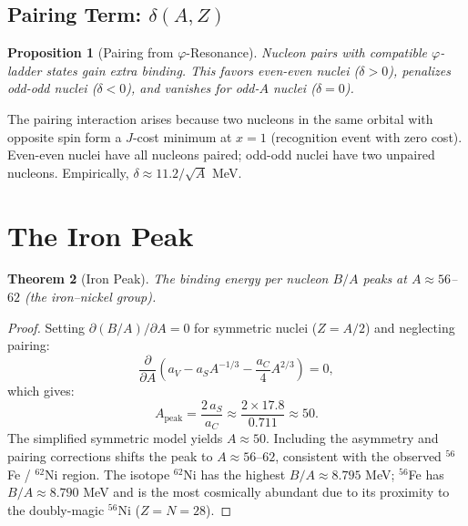 \documentclass[12pt,a4paper]{article}
\newtheorem{theorem}{Theorem}[section]
\newtheorem{proposition}[theorem]{Proposition}
\theoremstyle{definition}
\theoremstyle{remark}
\begin{document}
\subsection{Pairing Term: $\delta(A,Z)$}

\begin{proposition}[Pairing from $\varphi$-Resonance]
\label{prop:pairing}
Nucleon pairs with compatible $\varphi$-ladder states gain
extra binding.  This favors even-even nuclei
($\delta > 0$), penalizes odd-odd nuclei ($\delta < 0$),
and vanishes for odd-$A$ nuclei ($\delta = 0$).
\end{proposition}

The pairing interaction arises because two nucleons in the
same orbital with opposite spin form a $J$-cost minimum at
$x = 1$ (recognition event with zero cost).  Even-even nuclei
have all nucleons paired; odd-odd nuclei have two unpaired
nucleons.  Empirically,
$\delta \approx 11.2 / \sqrt{A}$ MeV.

\section{The Iron Peak}
\label{sec:iron}

\begin{theorem}[Iron Peak]
\label{thm:iron}
The binding energy per nucleon $B/A$ peaks at
$A \approx 56$--$62$ (the iron--nickel group).
\end{theorem}

\begin{proof}
Setting $\partial(B/A)/\partial A = 0$ for symmetric nuclei
($Z = A/2$) and neglecting pairing:
\begin{equation}
  \frac{\partial}{\partial A}\!\left(a_V - a_S A^{-1/3} -
  \frac{a_C}{4} A^{2/3}\right) = 0,
\end{equation}
which gives:
\begin{equation}
  A_{\mathrm{peak}} = \frac{2\,a_S}{a_C}
  \approx \frac{2 \times 17.8}{0.711}
  \approx 50.
\end{equation}
The simplified symmetric model yields $A \approx 50$.
Including the asymmetry and pairing corrections shifts the
peak to $A \approx 56$--$62$, consistent with the observed
$^{56}$Fe / $^{62}$Ni region.
The isotope $^{62}$Ni has the highest $B/A \approx
8.795$ MeV; $^{56}$Fe has $B/A \approx 8.790$ MeV and is
the most cosmically abundant due to its proximity to the
doubly-magic $^{56}$Ni ($Z = N = 28$).
\end{proof}
\end{document}
